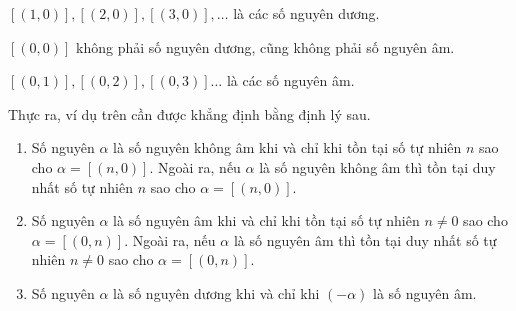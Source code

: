 \begin{example}
    $[(1, 0)], [(2, 0)], [(3, 0)], \ldots$ là các số nguyên dương.

    $[(0,0)]$ không phải số nguyên dương, cũng không phải số nguyên âm.

    $[(0, 1)], [(0, 2)], [(0, 3)] \ldots$ là các số nguyên âm.
\end{example}

\noindent Thực ra, ví dụ trên cần được khẳng định bằng định lý sau.

\begin{theorem}\label{theorem:positive-negative-nonnegative-integers}
    \begin{enumerate}[label={(\roman*)}]
        \item Số nguyên $\alpha$ là số nguyên không âm khi và chỉ khi tồn tại số tự nhiên $n$ sao cho $\alpha = [(n, 0)]$. Ngoài ra, nếu $\alpha$ là số nguyên không âm thì tồn tại duy nhất số tự nhiên $n$ sao cho $\alpha = [(n, 0)]$.
        \item Số nguyên $\alpha$ là số nguyên âm khi và chỉ khi tồn tại số tự nhiên $n\ne 0$ sao cho $\alpha = [(0, n)]$. Ngoài ra, nếu $\alpha$ là số nguyên âm thì tồn tại duy nhất số tự nhiên $n\ne 0$ sao cho $\alpha = [(0, n)]$.
        \item Số nguyên $\alpha$ là số nguyên dương khi và chỉ khi $(-\alpha)$ là số nguyên âm.
    \end{enumerate}
\end{theorem}


